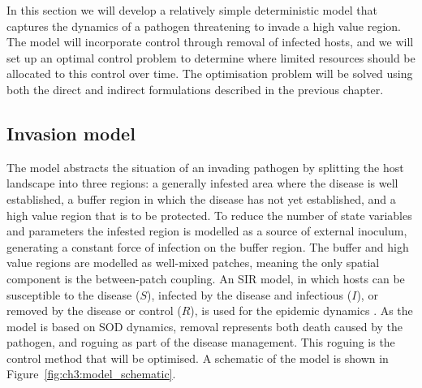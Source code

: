 In this section we will develop a relatively simple deterministic model that captures the dynamics of a pathogen threatening to invade a high value region. The model will incorporate control through removal of infected hosts, and we will set up an optimal control problem to determine where limited resources should be allocated to this control over time. The optimisation problem will be solved using both the direct and indirect formulations described in the previous chapter.

\subsection{Invasion model}

The model abstracts the situation of an invading pathogen by splitting the host landscape into three regions: a generally infested area where the disease is well established, a buffer region in which the disease has not yet established, and a high value region that is to be protected. To reduce the number of state variables and parameters the infested region is modelled as a source of external inoculum, generating a constant force of infection on the buffer region. The buffer and high value regions are modelled as well-mixed patches, meaning the only spatial component is the between-patch coupling. An SIR model, in which hosts can be susceptible to the disease ($S$), infected by the disease and infectious ($I$), or removed by the disease or control ($R$), is used for the epidemic dynamics \citep{keeling_modeling_2008}. As the model is based on SOD dynamics, removal represents both death caused by the pathogen, and roguing as part of the disease management. This roguing is the control method that will be optimised. A schematic of the model is shown in Figure~\ref{fig:ch3:model_schematic}.

